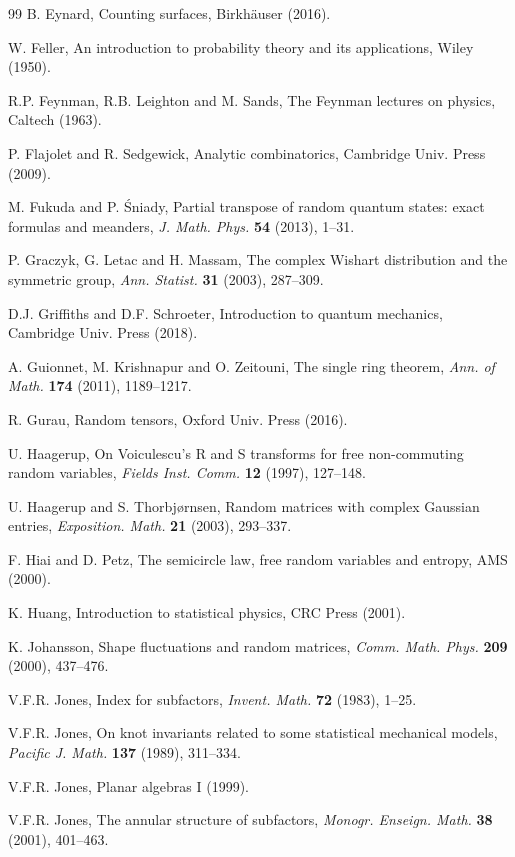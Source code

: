 \documentclass[12pt]{amsbook}
\begin{document}
\begin{thebibliography}{99}
B. Eynard, Counting surfaces, Birkh\"auser (2016).

W. Feller, An introduction to probability theory and its applications, Wiley (1950).

R.P. Feynman, R.B. Leighton and M. Sands, The Feynman lectures on physics, Caltech (1963).

P. Flajolet and R. Sedgewick, Analytic combinatorics, Cambridge Univ. Press (2009).

M. Fukuda and P. \'Sniady, Partial transpose of random quantum states: exact formulas and meanders, {\em J. Math. Phys.} {\bf 54} (2013), 1--31.

P. Graczyk, G. Letac and H. Massam, The complex Wishart distribution and the symmetric group, {\em Ann. Statist.} {\bf 31} (2003), 287--309.

D.J. Griffiths and D.F. Schroeter, Introduction to quantum mechanics, Cambridge Univ. Press (2018).

A. Guionnet, M. Krishnapur and O. Zeitouni, The single ring theorem, {\em Ann. of Math.} {\bf 174} (2011), 1189--1217.

R. Gurau, Random tensors, Oxford Univ. Press (2016).

U. Haagerup, On Voiculescu's R and S transforms for free non-commuting random variables, {\em Fields Inst. Comm.} {\bf 12} (1997), 127--148.

U. Haagerup and S. Thorbj\o rnsen, Random matrices with complex Gaussian entries, {\em Exposition. Math.} {\bf 21} (2003), 293--337.

F. Hiai and D. Petz, The semicircle law, free random variables and entropy, AMS (2000).

K. Huang, Introduction to statistical physics, CRC Press (2001).

K. Johansson, Shape fluctuations and random matrices, {\em Comm.  Math. Phys.} {\bf 209} (2000), 437--476.

V.F.R. Jones, Index for subfactors, {\em Invent. Math.} {\bf 72} (1983), 1--25.

V.F.R. Jones, On knot invariants related to some statistical mechanical models, {\em Pacific J. Math.} {\bf 137} (1989), 311--334.

V.F.R. Jones, Planar algebras I (1999).

V.F.R. Jones, The annular structure of subfactors, {\em Monogr. Enseign. Math.} {\bf 38} (2001), 401--463.


\end{thebibliography}
\end{document}
